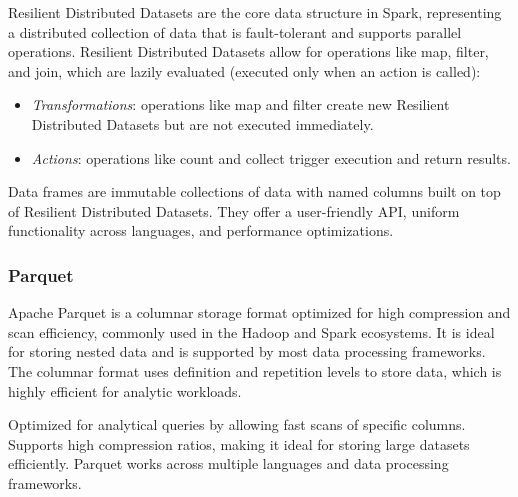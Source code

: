 Resilient Distributed Datasets are the core data structure in Spark, representing a distributed collection of data that is fault-tolerant and supports parallel operations. 
Resilient Distributed Datasets allow for operations like map, filter, and join, which are lazily evaluated (executed only when an action is called): 
\begin{itemize}
    \item \textit{Transformations}: operations like map and filter create new Resilient Distributed Datasets but are not executed immediately.
    \item \textit{Actions}: operations like count and collect trigger execution and return results.
\end{itemize}
Data frames are immutable collections of data with named columns built on top of Resilient Distributed Datasets. 
They offer a user-friendly API, uniform functionality across languages, and performance optimizations.

\subsubsection{Parquet}
Apache Parquet is a columnar storage format optimized for high compression and scan efficiency, commonly used in the Hadoop and Spark ecosystems. 
It is ideal for storing nested data and is supported by most data processing frameworks. The columnar format uses definition and repetition levels to store data, which is highly efficient for analytic workloads.

Optimized for analytical queries by allowing fast scans of specific columns.
Supports high compression ratios, making it ideal for storing large datasets efficiently.
Parquet works across multiple languages and data processing frameworks.